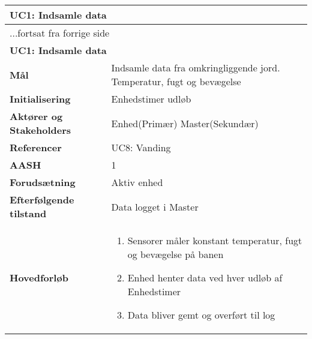 \begin{center} \centering \label{UC1}
	\begin{longtable}{|p{5cm}|p{9cm}|}  %
	\hline
		\multicolumn{2}{|l|}{\textbf{UC1: Indsamle data}} \\\hline %
		\endfirsthead
		
		\multicolumn{2}{l}{...fortsat fra forrige side} \\ \hline %
		\multicolumn{2}{|l|}{\textbf{UC1: Indsamle data}} \\\hline %
		\endhead	
		
		\textbf{Mål}								&Indsamle data fra omkringliggende jord. Temperatur, fugt og bevægelse			\\\hline
		\textbf{Initialisering}					&Enhedstimer udløb	\\\hline
		\textbf{Aktører og Stakeholders}			&Enhed(Primær) 		\newline 
												 Master(Sekundær)	\\\hline
		\textbf{Referencer}						&UC8: Vanding		\\\hline
		\textbf{AASH}							&1					\\\hline
		\textbf{Forudsætning}					&Aktiv enhed		\\\hline
		\textbf{Efterfølgende tilstand}			&Data logget i Master \\\hline
		\textbf{Hovedforløb}					
			&\begin{enumerate}
	
				\item Sensorer måler konstant temperatur, fugt og bevægelse på banen
				
				\item Enhed henter data ved hver udløb af Enhedstimer  
				
				\item Data bliver gemt og overført til log
				
			\end{enumerate}\\\hline
	\end{longtable}
\end{center}

